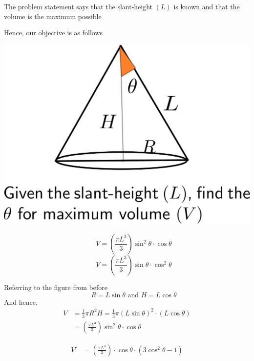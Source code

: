 \documentclass[14pt,fleqn]{extarticle}
\newcommand\kexp{ \left(\frac{\pi L^3}{3} \right)}
\begin{document}
\begin{problem}
\begin{step}
\begin{options}
    \end{options} 
     \reason 
     
     The problem statement says that the slant-height $(L)$ is known and that 
     the volume is the maximum possible \newline 
     
     Hence, our objective is as follows 
     \begin{center}
\includegraphics[scale=0.45]{figure.svg}
\end{center}
\end{step}


\begin{step}
  \begin{options} 
     \correct 
     \[ \qquad V = \kexp \sin^2\theta\cdot \cos\theta \]  
     \incorrect
        \[ \qquad V = \kexp \sin\theta\cdot \cos^2\theta \]
    \end{options} 
     \reason 
       
     Referring to the figure from before 
     \[ \qquad R = L\sin\theta \text{ and } H = L\cos\theta \] 
     And hence, 
     \begin{align}
	V &= \frac{1}{3}\pi R^2 H = \frac{1}{3}\pi \left(L\sin\theta \right)^2\cdot \left( L\cos\theta \right) \\
	&= \kexp \sin^2\theta\cdot \cos\theta 
\end{align}
\end{step}

\begin{step}
  \begin{options} 
     \correct 
       \begin{align}
	V' &= \kexp\cdot\cos\theta\cdot \left(3\cos^2\theta - 1 \right)
\end{align}


\end{options}
\end{step}
\end{problem}
\end{document}

